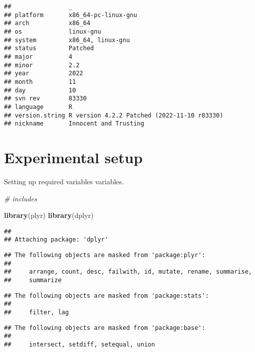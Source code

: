 \documentclass[]{book}
\newenvironment{Shaded}{\begin{snugshade}}{\end{snugshade}}
\newcommand{\CommentTok}[1]{\textcolor[rgb]{0.56,0.35,0.01}{\textit{#1}}}
\newcommand{\KeywordTok}[1]{\textcolor[rgb]{0.13,0.29,0.53}{\textbf{#1}}}
\newcommand{\NormalTok}[1]{#1}
\begin{document}
\begin{verbatim}
##                _                                          
## platform       x86_64-pc-linux-gnu                        
## arch           x86_64                                     
## os             linux-gnu                                  
## system         x86_64, linux-gnu                          
## status         Patched                                    
## major          4                                          
## minor          2.2                                        
## year           2022                                       
## month          11                                         
## day            10                                         
## svn rev        83330                                      
## language       R                                          
## version.string R version 4.2.2 Patched (2022-11-10 r83330)
## nickname       Innocent and Trusting
\end{verbatim}

\hypertarget{experimental-setup}{%
\section{Experimental setup}\label{experimental-setup}}

Setting up required variables variables.

\begin{Shaded}
\begin{Highlighting}[]
\CommentTok{# includes}

\KeywordTok{library}\NormalTok{(plyr)}
\KeywordTok{library}\NormalTok{(dplyr)}
\end{Highlighting}
\end{Shaded}

\begin{verbatim}
## 
## Attaching package: 'dplyr'
\end{verbatim}

\begin{verbatim}
## The following objects are masked from 'package:plyr':
## 
##     arrange, count, desc, failwith, id, mutate, rename, summarise,
##     summarize
\end{verbatim}

\begin{verbatim}
## The following objects are masked from 'package:stats':
## 
##     filter, lag
\end{verbatim}

\begin{verbatim}
## The following objects are masked from 'package:base':
## 
##     intersect, setdiff, setequal, union
\end{verbatim}
\end{document}
